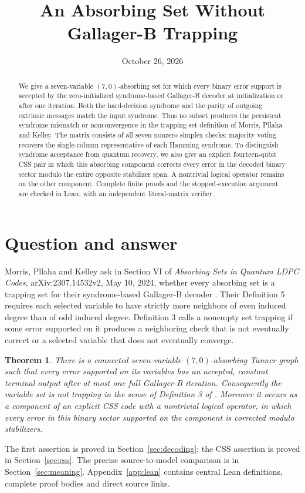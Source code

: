 \documentclass[11pt]{article}
\title{An Absorbing Set Without Gallager-B Trapping}
\author{}
\date{October 26, 2026}
\newtheorem{theorem}{Theorem}
\begin{document}
\maketitle
\begin{abstract}
We give a seven-variable $(7,0)$-absorbing set for which every binary error
support is accepted by the zero-initialized syndrome-based Gallager-B decoder
at initialization or after one iteration. Both the hard-decision syndrome and
the parity of outgoing extrinsic messages match the input syndrome. Thus no
subset produces the persistent syndrome mismatch or nonconvergence in the
trapping-set definition of Morris, Pllaha and Kelley. The matrix consists of
all seven nonzero simplex checks: majority voting recovers the single-column
representative of each Hamming syndrome. To distinguish syndrome acceptance
from quantum recovery, we also give an explicit fourteen-qubit CSS pair in
which this absorbing component corrects every error in the decoded binary
sector modulo the entire opposite stabilizer span. A nontrivial logical
operator remains on the other component. Complete finite proofs and the
stopped-execution argument are checked in Lean, with an independent
literal-matrix verifier.
\end{abstract}

\section{Question and answer}
Morris, Pllaha and Kelley ask in Section VI of
\emph{Absorbing Sets in Quantum LDPC Codes}, arXiv:2307.14532v2,
May 10, 2024, whether every absorbing set is a trapping set for their
syndrome-based Gallager-B decoder \cite{mpk}.
Their Definition 5 requires each selected variable to have strictly more
neighbors of even induced degree than of odd induced degree.
Definition 3 calls a nonempty set trapping if some error supported on it
produces a neighboring check that is not eventually correct or a selected
variable that does not eventually converge.

\begin{theorem}\label{thm:main}
There is a connected seven-variable $(7,0)$-absorbing Tanner graph such
that every error supported on its variables has an accepted, constant
terminal output after at most one full Gallager-B iteration. Consequently
the variable set is not trapping in the sense of Definition 3 of
\cite{mpk}. Moreover it occurs as a component of an explicit CSS code with
a nontrivial logical operator, in which every error in this binary sector
supported on the component is corrected modulo stabilizers.
\end{theorem}
The first assertion is proved in Section~\ref{sec:decoding}; the CSS
assertion is proved in Section~\ref{sec:css}. The precise source-to-model
comparison is in Section~\ref{sec:meaning}. Appendix~\ref{app:lean} contains
central Lean definitions, complete proof bodies and direct source links.
\end{document}
